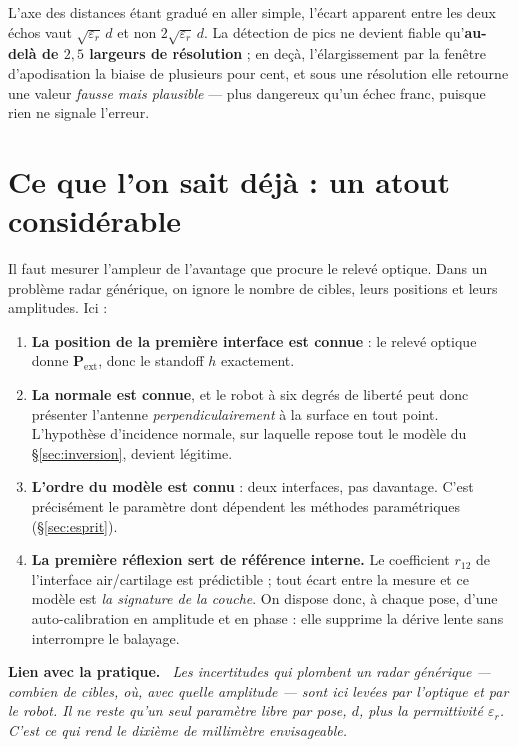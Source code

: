 \documentclass[11pt,a4paper]{article}
\newenvironment{implication}%
  {\par\medskip\begin{lrbox}{\implbox}\begin{minipage}{0.95\textwidth}%
   \textbf{Lien avec la pratique.}\itshape\ }%
  {\end{minipage}\end{lrbox}\noindent\fbox{\usebox{\implbox}}\par\medskip}
\newcommand{\eps}{\varepsilon_r}
\begin{document}
\noindent
L'axe des distances étant gradué en aller simple, l'écart apparent entre les deux
échos vaut $\sqrt{\eps}\,d$ et non $2\sqrt{\eps}\,d$. La détection de pics ne
devient fiable qu'\textbf{au-delà de $2{,}5$ largeurs de résolution} ; en deçà,
l'élargissement par la fenêtre d'apodisation la biaise de plusieurs pour cent, et
sous une résolution elle retourne une valeur \emph{fausse mais plausible} --- plus
dangereux qu'un échec franc, puisque rien ne signale l'erreur.

\section{Ce que l'on sait déjà : un atout considérable}

Il faut mesurer l'ampleur de l'avantage que procure le relevé optique. Dans un
problème radar générique, on ignore le nombre de cibles, leurs positions et
leurs amplitudes. Ici :

\begin{enumerate}
\item \textbf{La position de la première interface est connue} : le relevé
      optique donne $\mathbf{P}_{\text{ext}}$, donc le standoff $h$ exactement.
\item \textbf{La normale est connue}, et le robot à six degrés de liberté peut
      donc présenter l'antenne \emph{perpendiculairement} à la surface en tout
      point. L'hypothèse d'incidence normale, sur laquelle repose tout le
      modèle du \S\ref{sec:inversion}, devient légitime.
\item \textbf{L'ordre du modèle est connu} : deux interfaces, pas davantage.
      C'est précisément le paramètre dont dépendent les méthodes
      paramétriques (\S\ref{sec:esprit}).
\item \textbf{La première réflexion sert de référence interne.} Le coefficient
      $r_{12}$ de l'interface air/\allowbreak{}cartilage est prédictible ; tout écart entre
      la mesure et ce modèle est \emph{la signature de la couche}. On dispose
      donc, à chaque pose, d'une auto-calibration en amplitude et en phase :
      elle supprime la dérive lente sans interrompre le balayage.
\end{enumerate}

\begin{implication}
Les incertitudes qui plombent un radar générique --- combien de cibles, où,
avec quelle amplitude --- sont ici levées par l'optique et par le robot. Il ne
reste qu'un seul paramètre libre par pose, $d$, plus la permittivité $\eps$.
C'est ce qui rend le dixième de millimètre envisageable.
\end{implication}
\end{document}

